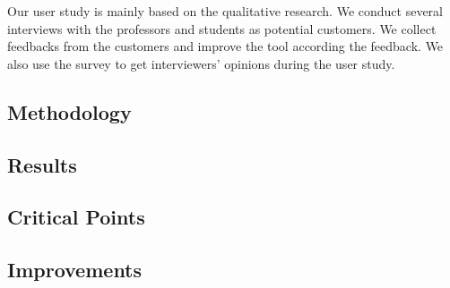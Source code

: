 Our user study is mainly based on the qualitative research.
We conduct several interviews with the professors and students as potential customers.
We collect feedbacks from the customers and improve the tool according the feedback.
We also use the survey to get interviewers' opinions during the user study.

\subsection{Methodology}

\subsection{Results}

\subsection{Critical Points}

\subsection{Improvements}
